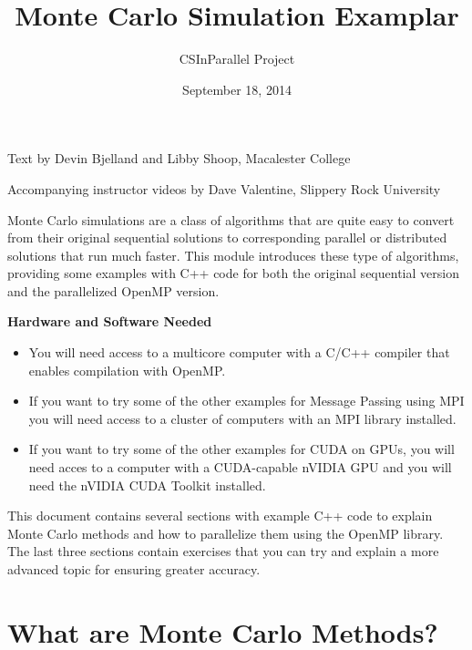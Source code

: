 \documentclass[letterpaper,10pt,openany,oneside]{sphinxmanual}
\title{Monte Carlo Simulation Examplar}
\date{September 18, 2014}
\author{CSInParallel Project}
\begin{document}
\maketitle
\tableofcontents
{}\label{index::doc}


Text by Devin Bjelland and Libby Shoop, Macalester College

Accompanying instructor videos by Dave Valentine, Slippery Rock University

Monte Carlo simulations are a class of algorithms that are quite easy
to convert from their original sequential solutions to corresponding parallel
or distributed solutions that run much faster.  This module introduces these
type of algorithms, providing some examples with C++ code for both the original
sequential version and the parallelized OpenMP version.

\textbf{Hardware and Software Needed}
\begin{itemize}
\item {} 
You will need access to a multicore computer with a C/C++ compiler that enables compilation with OpenMP.

\item {} 
If you want to try some of the other examples for Message Passing using MPI you will need access to a cluster of computers with an MPI library installed.

\item {} 
If you want to try some of the other examples for CUDA on GPUs, you will need acces to a computer with a CUDA-capable nVIDIA GPU and you will need the nVIDIA CUDA Toolkit installed.

\end{itemize}

This document contains several sections with example C++ code to explain Monte Carlo methods
and how to parallelize them using the OpenMP library.  The last three sections contain
exercises that you can try and explain a more advanced topic for ensuring greater accuracy.


\chapter{What are Monte Carlo Methods?}
\label{Introduction/Introduction:what-are-monte-carlo-methods}\label{Introduction/Introduction:monte-carlo-simulation-exemplar}\label{Introduction/Introduction::doc}
\end{document}
